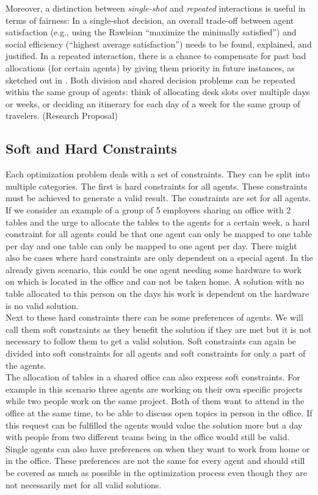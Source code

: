 \documentclass[german, a4paper, 11pt, oneside]{scrbook}
\begin{document}
Moreover, a distinction between \emph{single-shot} and \emph{repeated} interactions is useful in terms of fairness: In a single-shot decision, an overall trade-off between agent satisfaction (e.g., using the Rawlsian ``maximize the minimally satisfied'') and social efficiency (``highest average satisfaction'') needs to be found, explained, and justified. In a repeated interaction, there is a chance to compensate for past bad allocations (for certain agents) by giving them priority in future instances, as sketched out in \cite{.2022}.  Both division and shared decision problems can be repeated within the same group of agents: think of allocating desk slots over multiple days or weeks, or deciding an itinerary for each day of a week for the same group of travelers. (Research Proposal)

\subsection{Soft and Hard Constraints}
Each optimization problem deals with a set of constraints. They can be split into multiple categories. The first is hard constraints for all agents. These constraints must be achieved to generate a valid result. The constraints are set for all agents.\cite{.2022} \\If we consider an example of a group of 5 employees sharing an office with 2 tables and the urge to allocate the tables to the agents for a certain week, a hard constraint for all agents could be that one agent can only be mapped to one table per day and one table can only be mapped to one agent per day. There might also be cases where hard constraints are only dependent on a special agent. In the already given scenario, this could be one agent needing some hardware to work on which is located in the office and can not be taken home. A solution with no table allocated to this person on the days his work is dependent on the hardware is no valid solution. \\Next to these hard constraints there can be some preferences of agents. We will call them soft constraints as they benefit the solution if they are met but it is not necessary to follow them to get a valid solution. \cite{.2020,.2022} Soft constraints can again be divided into soft constraints for all agents and soft constraints for only a part of the agents. \\The allocation of tables in a shared office can also express soft constraints. For example in this scenario three agents are working on their own specific projects while two people work on the same project. Both of them want to attend in the office at the same time, to be able to discuss open topics in person in the office. If this request can be fulfilled the agents would value the solution more but a day with people from two different teams being in the office would still be valid. \\Single agents can also have preferences on when they want to work from home or in the office. These preferences are not the same for every agent and should still be covered as much as possible in the optimization process even though they are not necessarily met for all valid solutions. \cite{.2022}
\end{document}
